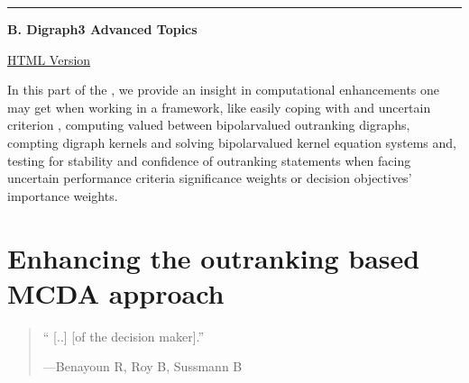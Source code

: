 \documentclass[a4paper,12pt,english]{sphinxhowto}
\begin{document}
    \clearpage

    
\pagestyle{plain}

    
    
\pagestyle{normal}
\label{\detokenize{pearls::doc}}
\begingroup
{}


\label{\detokenize{pearls:pearls-label}}

\bigskip\hrule\bigskip


\textbf{\Large{B. Digraph3 Advanced Topics}}

\href{https://digraph3.readthedocs.io/en/latest/index.html}{HTML Version}
\vspace{5mm}

\sphinxAtStartPar
In this part of the  , we provide an insight in computational enhancements one may get when working in a  framework, like \sphinxhyphen{} easily coping with  and uncertain criterion , \sphinxhyphen{} computing valued  between bipolar\sphinxhyphen{}valued outranking digraphs, \sphinxhyphen{} compting digraph kernels and solving bipolar\sphinxhyphen{}valued kernel equation systems and, \sphinxhyphen{} testing for stability and confidence of outranking statements when facing uncertain performance criteria significance weights or decision objectives’ importance weights.

\sphinxtableofcontents


\section{Enhancing the outranking based MCDA approach}
\label{\detokenize{pearls:enhancing-the-outranking-based-mcda-approach}}\label{\detokenize{pearls:enhancing-outranking-label}}\begin{quote}

\sphinxAtStartPar
“ {[}..{]}  {[}of the decision maker{]}.”

\begin{flushright}
---Benayoun R, Roy B, Sussmann B %
\begin{footnote}[13]\sphinxAtStartFootnote
{}
%
\end{footnote}
\end{flushright}
\end{quote}
\end{document}
